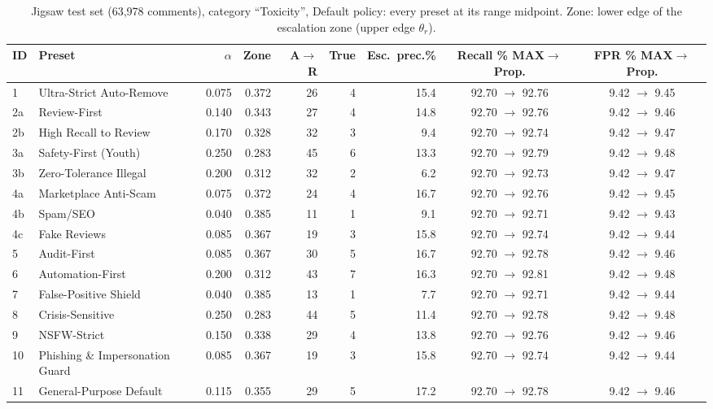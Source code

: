 \begin{table}[!t]
\caption{Jigsaw test set (63,978 comments), category ``Toxicity'', Default policy: every preset at its range midpoint.
Zone: lower edge of the escalation zone (upper edge $\theta_r$).}
\label{tab:jigsaw-presets}
\centering\scriptsize
\begin{tabular}{@{}llrrrrrcc@{}}
\toprule
\textbf{ID} & \textbf{Preset} & $\alpha$ & \textbf{Zone} & \textbf{A$\to$R} & \textbf{True} & \textbf{Esc.\ prec.\%} &
\textbf{Recall \% MAX$\to$Prop.} & \textbf{FPR \% MAX$\to$Prop.} \\
\midrule
1 & Ultra-Strict Auto-Remove & 0.075 & 0.372 & 26 & 4 & 15.4 & 92.70 $\to$ 92.76 & 9.42 $\to$ 9.45 \\
2a & Review-First & 0.140 & 0.343 & 27 & 4 & 14.8 & 92.70 $\to$ 92.76 & 9.42 $\to$ 9.46 \\
2b & High Recall to Review & 0.170 & 0.328 & 32 & 3 & 9.4 & 92.70 $\to$ 92.74 & 9.42 $\to$ 9.47 \\
3a & Safety-First (Youth) & 0.250 & 0.283 & 45 & 6 & 13.3 & 92.70 $\to$ 92.79 & 9.42 $\to$ 9.48 \\
3b & Zero-Tolerance Illegal & 0.200 & 0.312 & 32 & 2 & 6.2 & 92.70 $\to$ 92.73 & 9.42 $\to$ 9.47 \\
4a & Marketplace Anti-Scam & 0.075 & 0.372 & 24 & 4 & 16.7 & 92.70 $\to$ 92.76 & 9.42 $\to$ 9.45 \\
4b & Spam/SEO & 0.040 & 0.385 & 11 & 1 & 9.1 & 92.70 $\to$ 92.71 & 9.42 $\to$ 9.43 \\
4c & Fake Reviews & 0.085 & 0.367 & 19 & 3 & 15.8 & 92.70 $\to$ 92.74 & 9.42 $\to$ 9.44 \\
5 & Audit-First & 0.085 & 0.367 & 30 & 5 & 16.7 & 92.70 $\to$ 92.78 & 9.42 $\to$ 9.46 \\
6 & Automation-First & 0.200 & 0.312 & 43 & 7 & 16.3 & 92.70 $\to$ 92.81 & 9.42 $\to$ 9.48 \\
7 & False-Positive Shield & 0.040 & 0.385 & 13 & 1 & 7.7 & 92.70 $\to$ 92.71 & 9.42 $\to$ 9.44 \\
8 & Crisis-Sensitive & 0.250 & 0.283 & 44 & 5 & 11.4 & 92.70 $\to$ 92.78 & 9.42 $\to$ 9.48 \\
9 & NSFW-Strict & 0.150 & 0.338 & 29 & 4 & 13.8 & 92.70 $\to$ 92.76 & 9.42 $\to$ 9.46 \\
10 & Phishing \& Impersonation Guard & 0.085 & 0.367 & 19 & 3 & 15.8 & 92.70 $\to$ 92.74 & 9.42 $\to$ 9.44 \\
11 & General-Purpose Default & 0.115 & 0.355 & 29 & 5 & 17.2 & 92.70 $\to$ 92.78 & 9.42 $\to$ 9.46 \\
\bottomrule
\end{tabular}
\end{table}
